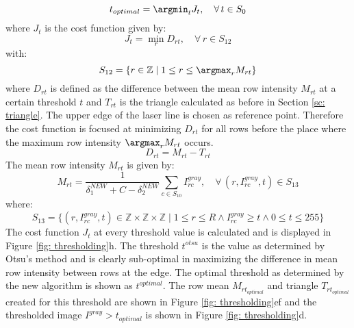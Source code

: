 \begin{equation}
t_{optimal} = \argmin_t J_t, \quad \forall \, t \in S_0
\end{equation}
where $J_t$ is the cost function given by:
\begin{equation}
J_t = \min_r D_{rt}, \quad \forall \, r \in S_{12}
\end{equation}
with:
\begin{equation}
S_{12} = \{ r \in \mathbb {Z} \mid 1 \leq r \leq \argmax_r M_{rt}  \}
\end{equation}
where $D_{rt}$ is defined as the difference between the mean row intensity $M_{rt}$ at a certain threshold $t$ and $T_{rt}$ is the triangle calculated as before in Section \ref{sc: triangle}. The upper edge of the laser line is chosen as reference point. Therefore the cost function is focused at minimizing $D_{rt}$ for all rows before the place where the maximum row intensity $\argmax_r M_{rt}$ occurs.
\begin{equation}
D_{rt} = M_{rt} - T_{rt}
\end{equation}
The mean row intensity $M_{rt}$ is given by:
\begin{equation}
M_{rt} =  \frac{1}{\delta^{NEW}_1 + C - \delta^{NEW}_2}  \sum_{c \in S_{10}}  I^{gray}_{rc}, \quad \forall \, (r,I^{gray}_{rc},t) \in S_{13}
\end{equation}
where:
\begin{equation}
S_{13} = \{ (r,I^{gray}_{rc},t) \in \mathbb {Z} \times \mathbb {Z} \times \mathbb {Z} \mid 1 \leq r \leq R \land I^{gray}_{rc} \geq t \land 0 \leq t \leq 255 \}
\end{equation}
The cost function $J_t$ at every threshold value is calculated and is displayed in Figure \ref{fig: thresholding}h. The threshold $t^{otsu}$ is the value as determined by Otsu's method and is clearly sub-optimal in maximizing the difference in mean row intensity between rows at the edge. The optimal threshold as determined by the new algorithm is shown as $t^{optimal}$. The row mean $M_{rt_{optimal}}$ and triangle $T_{rt_{optimal}}$ created for this threshold are shown in Figure \ref{fig: thresholding}ef and the thresholded image $I^{gray} > t_{optimal}$ is shown in Figure \ref{fig: thresholding}d. 

